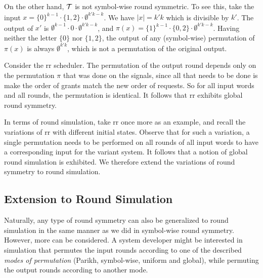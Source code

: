 \begin{example}
On the other hand, $\mathcal{T}$ is not symbol-wise round symmetric. To see this, take the input $x=\{0\}^{k-1}\cdot\{1,2\}\cdot\emptyset^{k'k-k}$. We have $|x|=k'k$ which is divisible by $k'$. The output of $x'$ is $\emptyset^{k-1}\cdot0\cdot\emptyset^{k'k-k}$, and $\pi(x)=\{1\}^{k-1}\cdot\{0,2\}\cdot\emptyset^{k'k-k}$. Having neither the letter $\{0\}$ nor $\{1,2\}$, the output of any (symbol-wise) permutation of $\pi(x)$ is always $\emptyset^{k'k}$, which is not a permutation of the original output.

\end{example}

\begin{example}
Consider the \gls{rr} scheduler. The permutation of the output round depends only on the permutation $\pi$ that was done on the signals, since all that needs to be done is make the order of grants match the new order of requests. So for all input words and all rounds, the permutation is identical. It follows that \gls{rr} exhibits global round symmetry.
\end{example}

In terms of round simulation, take \gls{rr} once more as an example, and recall the variations of \gls{rr} with different initial states. Observe that for such a variation, a single permutation needs to be performed on all rounds of all input words to have a corresponding input for the variant system. It follows that a notion of global round simulation is exhibited. We therefore extend the variations of round symmetry to round simulation.

\subsection{Extension to Round Simulation}

Naturally, any type of round symmetry can also be generalized to round simulation in the same manner as we did in symbol-wise round symmetry. However, more can be considered. A system developer might be interested in simulation that permutes the input rounds according to one of the described \emph{modes of permutation} (Parikh, symbol-wise, uniform and global), while permuting the output rounds according to another mode.

